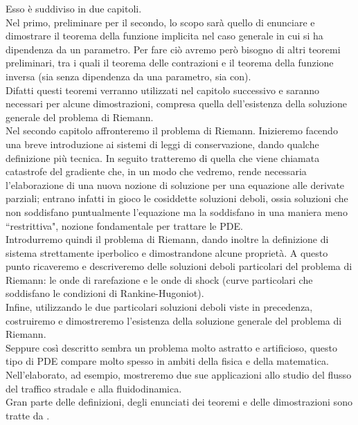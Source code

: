 Esso è suddiviso in due capitoli.\\
Nel primo, preliminare per il secondo, lo scopo sarà quello di enunciare e dimostrare il teorema della funzione implicita nel caso generale in cui si ha dipendenza da un parametro. Per fare ciò avremo però bisogno di altri teoremi preliminari, tra i quali il teorema delle contrazioni e il teorema della funzione inversa (sia senza dipendenza da una parametro, sia con).\\
Difatti questi teoremi verranno utilizzati nel capitolo successivo e saranno necessari per alcune dimostrazioni, compresa quella dell'esistenza della soluzione generale del problema di Riemann.\\
Nel secondo capitolo affronteremo il problema di Riemann. Inizieremo facendo una breve introduzione ai sistemi di leggi di conservazione, dando qualche definizione più tecnica. In seguito tratteremo di quella che viene chiamata catastrofe del gradiente che, in un modo che vedremo, rende necessaria l'elaborazione di una nuova nozione di soluzione per una equazione alle derivate parziali; entrano infatti in gioco le cosiddette soluzioni deboli, ossia soluzioni che non soddisfano puntualmente l'equazione ma la soddisfano in una maniera meno ``restrittiva", nozione fondamentale per trattare le PDE.\\ Introdurremo quindi il problema di Riemann, dando inoltre la definizione di sistema strettamente iperbolico e dimostrandone alcune proprietà. A questo punto ricaveremo e descriveremo delle soluzioni deboli particolari del problema di Riemann: le onde di rarefazione e le onde di shock (curve particolari che soddisfano le condizioni di Rankine-Hugoniot).\\
Infine, utilizzando le due particolari soluzioni deboli viste in precedenza, costruiremo e dimostreremo l'esistenza della soluzione generale del problema di Riemann.\\
Seppure così descritto sembra un problema molto astratto e artificioso, questo tipo di PDE compare molto spesso in ambiti della fisica e della matematica. Nell'elaborato, ad esempio, mostreremo due sue applicazioni allo studio del flusso del traffico stradale e alla fluidodinamica.\\
Gran parte delle definizioni, degli enunciati dei teoremi e delle dimostrazioni sono tratte da \cite{bressan_2000}.